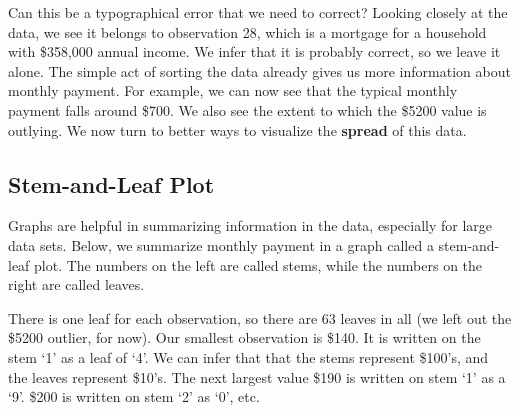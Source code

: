 \documentclass[11pt, chapterprefix=true]{scrbook}\usepackage[]{graphicx}\usepackage[]{color}
\begin{document}

Can this be a typographical error that we need to correct?  Looking closely at the data, we see it belongs to observation 28, which is a mortgage for a household with \$358,000 annual income.  We infer that it is probably correct, so we leave it alone. The simple act of sorting the data already gives us more information about monthly payment.  For example, we can now see that the typical monthly payment falls around \$700.  We also see the extent to which the \$5200 value is outlying. We now turn to better ways to visualize the \textbf{spread} of this data.

\subsection{Stem-and-Leaf Plot}

Graphs are helpful in summarizing information in the data, especially for large data sets.  Below, we summarize monthly payment in a graph called a stem-and-leaf plot.  The numbers on the left are called stems, while the numbers on the right are called leaves.

There is one leaf for each observation, so there are 63 leaves in all (we left out the \$5200 outlier, for now).  Our smallest observation is \$140.  It is written on the stem `1' as a leaf of `4'.  We can infer that that the stems represent \$100's, and the leaves represent \$10's.  The next largest value \$190 is written on stem `1' as a `9'.   \$200 is written on stem `2' as `0', etc.
\end{document}
